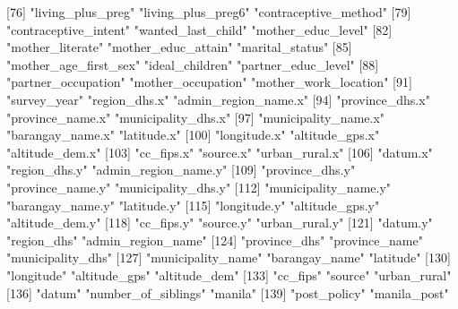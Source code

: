  [76] "living_plus_preg"          "living_plus_preg6"         "contraceptive_method"     
 [79] "contraceptive_intent"      "wanted_last_child"         "mother_educ_level"        
 [82] "mother_literate"           "mother_educ_attain"        "marital_status"           
 [85] "mother_age_first_sex"      "ideal_children"            "partner_educ_level"       
 [88] "partner_occupation"        "mother_occupation"         "mother_work_location"     
 [91] "survey_year"               "region_dhs.x"              "admin_region_name.x"      
 [94] "province_dhs.x"            "province_name.x"           "municipality_dhs.x"       
 [97] "municipality_name.x"       "barangay_name.x"           "latitude.x"               
[100] "longitude.x"               "altitude_gps.x"            "altitude_dem.x"           
[103] "cc_fips.x"                 "source.x"                  "urban_rural.x"            
[106] "datum.x"                   "region_dhs.y"              "admin_region_name.y"      
[109] "province_dhs.y"            "province_name.y"           "municipality_dhs.y"       
[112] "municipality_name.y"       "barangay_name.y"           "latitude.y"               
[115] "longitude.y"               "altitude_gps.y"            "altitude_dem.y"           
[118] "cc_fips.y"                 "source.y"                  "urban_rural.y"            
[121] "datum.y"                   "region_dhs"                "admin_region_name"        
[124] "province_dhs"              "province_name"             "municipality_dhs"         
[127] "municipality_name"         "barangay_name"             "latitude"                 
[130] "longitude"                 "altitude_gps"              "altitude_dem"             
[133] "cc_fips"                   "source"                    "urban_rural"              
[136] "datum"                     "number_of_siblings"        "manila"                   
[139] "post_policy"               "manila_post"              
